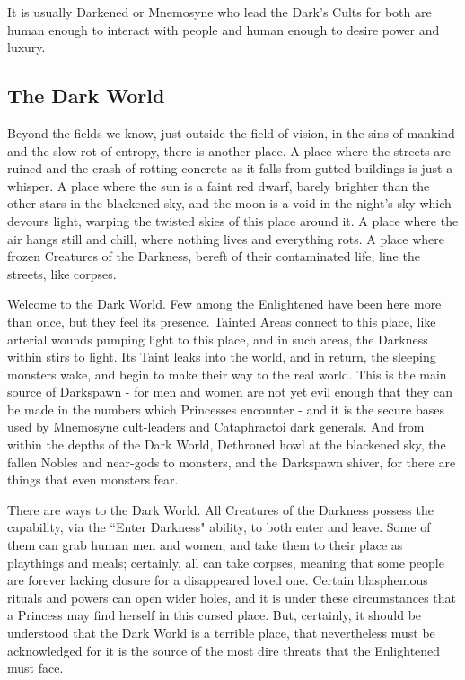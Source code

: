 It is usually Darkened or Mnemosyne who lead the Dark's Cults for both are human enough to interact with people and human enough to desire power and luxury. 

\subsection*{The Dark World}

Beyond the fields we know, just outside the field of vision, in the sins of mankind and the slow rot of entropy, there is another place. A place where the streets are ruined and the crash of rotting concrete as it falls from gutted buildings is just a whisper. A place where the sun is a faint red dwarf, barely brighter than the other stars in the blackened sky, and the moon is a void in the night's sky which devours light, warping the twisted skies of this place around it. A place where the air hangs still and chill, where nothing lives and everything rots. A place where frozen Creatures of the Darkness, bereft of their contaminated life, line the streets, like corpses.

Welcome to the Dark World. Few among the Enlightened have been here more than once, but they feel its presence. Tainted Areas connect to this place, like arterial wounds pumping light to this place, and in such areas, the Darkness within stirs to light. Its Taint leaks into the world, and in return, the sleeping monsters wake, and begin to make their way to the real world. This is the main source of Darkspawn - for men and women are not yet evil enough that they can be made in the numbers which Princesses encounter - and it is the secure bases used by Mnemosyne cult-leaders and Cataphractoi dark generals. And from within the depths of the Dark World, Dethroned howl at the blackened sky, the fallen Nobles and near-gods to monsters, and the Darkspawn shiver, for there are things that even monsters fear.

There are ways to the Dark World. All Creatures of the Darkness possess the capability, via the \textquotedblleft Enter Darkness" ability, to both enter and leave. Some of them can grab human men and women, and take them to their place as playthings and meals; certainly, all can take corpses, meaning that some people are forever lacking closure for a disappeared loved one. Certain blasphemous rituals and powers can open wider holes, and it is under these circumstances that a Princess may find herself in this cursed place. But, certainly, it should be understood that the Dark World is a terrible place, that nevertheless must be acknowledged for it is the source of the most dire threats that the Enlightened must face. 

